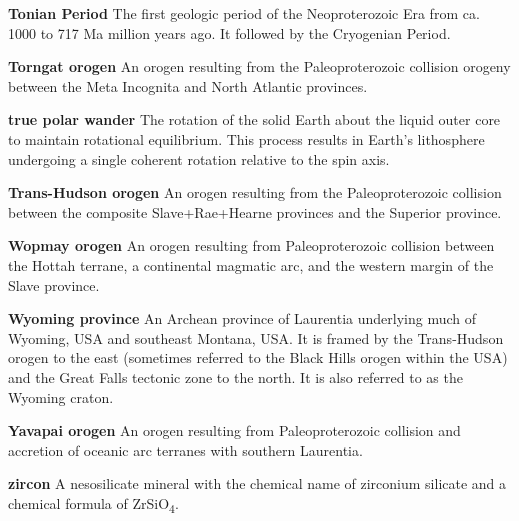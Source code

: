 \documentclass[twocolumn, switch]{article} %
\begin{document}
\noindent\textbf{Tonian Period } The first geologic period of the Neoproterozoic Era from ca. 1000 to 717 Ma million years ago. It followed by the Cryogenian Period.

\noindent\textbf{Torngat orogen } An orogen resulting from the Paleoproterozoic collision orogeny between the Meta Incognita and North Atlantic provinces.

\noindent\textbf{true polar wander } The rotation of the solid Earth about the liquid outer core to maintain rotational equilibrium. This process results in Earth's lithosphere undergoing a single coherent rotation relative to the spin axis.

\noindent\textbf{Trans-Hudson orogen } An orogen resulting from the Paleoproterozoic collision between the composite Slave+Rae+Hearne provinces and the Superior province.

\noindent\textbf{Wopmay orogen } An orogen resulting from Paleoproterozoic collision between the Hottah terrane, a continental magmatic arc, and the western margin of the Slave province.

\noindent\textbf{Wyoming province } An Archean province of Laurentia underlying much of Wyoming, USA and southeast Montana, USA. It is framed by the Trans-Hudson orogen to the east (sometimes referred to the Black Hills orogen within the USA) and the Great Falls tectonic zone to the north. It is also referred to as the Wyoming craton.

\noindent\textbf{Yavapai orogen } An orogen resulting from Paleoproterozoic collision and accretion of oceanic arc terranes with southern Laurentia.

\noindent\textbf{zircon } A nesosilicate mineral with the chemical name of zirconium silicate and a chemical formula of ZrSiO\textsubscript{4}.


\footnotesize

\newpage
\end{document}
